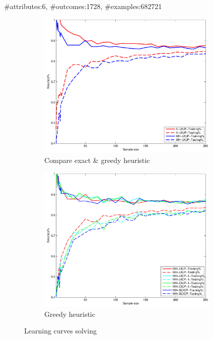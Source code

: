 {
	\begin{center}
		\#attributes:6, \#outcomes:1728, \#examples:682721
	\end{center}

  \begin{figure}
    \centering
    \begin{subfigure}[b]{0.48\textwidth}
      \centering
      \includegraphics[width=0.95\textwidth]{figs/PrefLearnResults/MatLabOutput/CarEvaluation_Trees_X_MH.pdf}
      \caption{Compare exact \& greedy heuristic}
    \end{subfigure}
    \begin{subfigure}[b]{0.48\textwidth}
      \centering
      \includegraphics[width=0.95\textwidth]{figs/PrefLearnResults/MatLabOutput/CarEvaluation_Trees_MH.pdf}
      \caption{Greedy heuristic}
    \end{subfigure}

    \caption{Learning curves solving }
  \end{figure}
}

